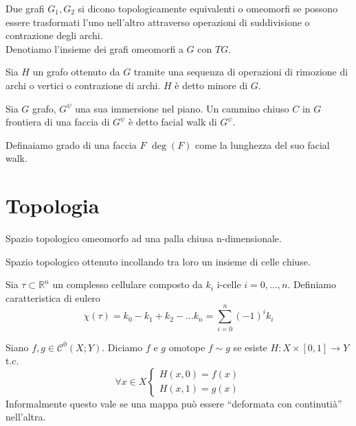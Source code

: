 \begin{definizione}
    Due grafi \(G_1,G_2\) si dicono topologicamente equivalenti o omeomorfi se possono essere trasformati l'uno nell'altro attraverso operazioni di suddivisione o contrazione degli archi.
    \\ Denotiamo l'insieme dei grafi omeomorfi a \(G\) con \(TG\).
\end{definizione}

\begin{definizione}[Minore]
    Sia \(H\) un grafo ottenuto da \(G\) tramite una sequenza di operazioni di rimozione di archi o vertici o contrazione di archi. \(H\) è detto minore di \(G\).
\end{definizione}

\begin{definizione}
    Sia \(G\) grafo, \(G^\psi\) una sua immersione nel piano. Un cammino chiuso \(C\) in \(G\) frontiera di una faccia di \(G^\psi\) è detto facial walk di \(G^\psi\).
\end{definizione}

\begin{definizione}
    Definaiamo grado di una faccia \(F\) \(\deg(F)\) come la lunghezza del suo facial walk.
\end{definizione}


\section{Topologia}

\begin{definizione}
    Spazio topologico omeomorfo ad una palla chiusa n-dimensionale.
\end{definizione}
\begin{definizione}
    Spazio topologico ottenuto incollando tra loro un insieme di celle chiuse.
\end{definizione}
\begin{definizione}
    Sia \(\tau \subset \mathbb{R}^n\) un complesso cellulare composto da \(k_i\) i-celle \(i=0,\dots,n\). Definiamo caratteristica di eulero
    \begin{equation}
        \chi(\tau) = k_0 - k_1 + k_2 - \dots k_n = \sum_{i=0}^{n}{(-1)}^i k_i
    \end{equation}
\end{definizione}

\begin{definizione}
    Siano \(f,g \in \mathcal{C}^0(X;Y)\). Diciamo \(f\) e \(g\) omotope \(f \sim g\) se esiste \(H : X \times [0,1] \to Y\) t.c.
    \begin{equation}
        \forall x \in X \begin{cases}
            H(x,0)=f(x) \\
            H(x,1)=g(x)
        \end{cases}
    \end{equation}
    Informalmente questo vale se una mappa può essere “deformata con continutià” nell'altra.
\end{definizione}

